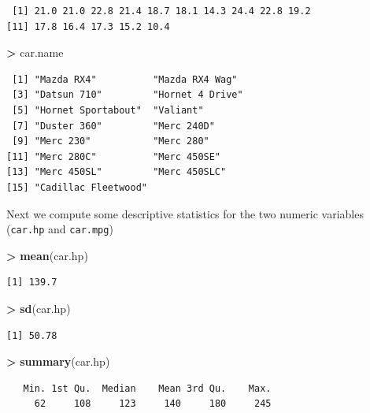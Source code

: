 \documentclass[]{krantz}
\makeatletter
\newenvironment{Shaded}{\begin{snugshade}}{\end{snugshade}}
\newcommand{\KeywordTok}[1]{\textcolor[rgb]{0.27,0.27,0.27}{\textbf{#1}}}
\newcommand{\StringTok}[1]{\textcolor[rgb]{0.5,0.5,0.5}{#1}}
\newcommand{\OperatorTok}[1]{\textcolor[rgb]{0.43,0.43,0.43}{\textbf{#1}}}
\newcommand{\NormalTok}[1]{#1}
\newenvironment{kframe}{%
\medskip{}
\setlength{\fboxsep}{.8em}
 \def\at@end@of@kframe{}%
 \ifinner\ifhmode%
  \def\at@end@of@kframe{\end{minipage}}%
  \begin{minipage}{\columnwidth}%
 \fi\fi%
 \def\FrameCommand##1{\hskip\@totalleftmargin \hskip-\fboxsep
 \colorbox{shadecolor}{##1}\hskip-\fboxsep
     \hskip-\linewidth \hskip-\@totalleftmargin \hskip\columnwidth}%
 \MakeFramed {\advance\hsize-\width
   \@totalleftmargin\z@ \linewidth\hsize
   \@setminipage}}%
 {\par\unskip\endMakeFramed%
 \at@end@of@kframe}
\renewenvironment{Shaded}{\begin{kframe}}{\end{kframe}}
\makeatother
\begin{document}
\begin{verbatim}
 [1] 21.0 21.0 22.8 21.4 18.7 18.1 14.3 24.4 22.8 19.2
[11] 17.8 16.4 17.3 15.2 10.4
\end{verbatim}

\begin{Shaded}
\begin{Highlighting}[]
\OperatorTok{>}\StringTok{ }\NormalTok{car.name}
\end{Highlighting}
\end{Shaded}

\begin{verbatim}
 [1] "Mazda RX4"          "Mazda RX4 Wag"     
 [3] "Datsun 710"         "Hornet 4 Drive"    
 [5] "Hornet Sportabout"  "Valiant"           
 [7] "Duster 360"         "Merc 240D"         
 [9] "Merc 230"           "Merc 280"          
[11] "Merc 280C"          "Merc 450SE"        
[13] "Merc 450SL"         "Merc 450SLC"       
[15] "Cadillac Fleetwood"
\end{verbatim}

Next we compute some descriptive statistics for the two numeric
variables (\texttt{car.hp} and \texttt{car.mpg})

\begin{Shaded}
\begin{Highlighting}[]
\OperatorTok{>}\StringTok{ }\KeywordTok{mean}\NormalTok{(car.hp)}
\end{Highlighting}
\end{Shaded}

\begin{verbatim}
[1] 139.7
\end{verbatim}

\begin{Shaded}
\begin{Highlighting}[]
\OperatorTok{>}\StringTok{ }\KeywordTok{sd}\NormalTok{(car.hp)}
\end{Highlighting}
\end{Shaded}

\begin{verbatim}
[1] 50.78
\end{verbatim}

\begin{Shaded}
\begin{Highlighting}[]
\OperatorTok{>}\StringTok{ }\KeywordTok{summary}\NormalTok{(car.hp)}
\end{Highlighting}
\end{Shaded}

\begin{verbatim}
   Min. 1st Qu.  Median    Mean 3rd Qu.    Max. 
     62     108     123     140     180     245 
\end{verbatim}
\end{document}
